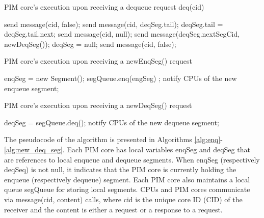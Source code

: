 \begin{algorithm}[ht!]
{\footnotesize
\caption{PIM core's execution upon receiving a dequeue request deq(cid)}
\label{alg:deq}
\begin{algorithmic}[1]
        \State send message(cid, false);
    \Else
			\State send message(cid, deqSeg.tail);
            \State deqSeg.tail = deqSeg.tail.next;   
        \Else
				\State send message(cid, null);
			\Else
                \State send message(deqSeg.nextSegCid, newDeqSeg());
                \State deqSeg = null;
                \State send message(cid, false);
            \EndIf            
        \EndIf 
    \EndIf 
\end{algorithmic}
}
\end{algorithm}

\begin{algorithm}[ht!]
{\footnotesize
\caption{PIM core's execution upon receiving a newEnqSeg() request }
\label{alg:new_enq_seg}
\begin{algorithmic}[1]
	\State enqSeg = new Segment();
	\State segQueue.enq(engSeg) ;
	\State notify CPUs of the new enqueue segment;
\end{algorithmic}
}
\end{algorithm}

\begin{algorithm}[ht!]
{\footnotesize
\caption{PIM core's execution upon receiving a newDeqSeg() request}
\label{alg:new_deq_seg}
\begin{algorithmic}[1]
	\State deqSeg = segQueue.deq();
	\State notify CPUs of the new dequeue segment; 
\end{algorithmic}
}
\end{algorithm}

The pseudocode of the algorithm is presented in 
Algorithms \ref{alg:enq}-\ref{alg:new_deq_seg}. 
Each PIM core has local variables enqSeg and deqSeg that are references to 
local enqueue and dequeue segments.
When enqSeg (respectively deqSeq) is not null, it indicates that the PIM core is currently 
holding the enqueue (respectively dequeue) segment.
Each PIM core also maintains a local queue segQueue for storing local segments.
CPUs and PIM cores communicate via message(cid, content) calls, where cid is the unique core ID (CID) 
of the receiver and the content is either a request or a response to a request.

